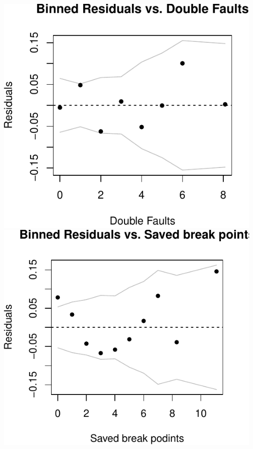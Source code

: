 \documentclass[]{article}
\newenvironment{Shaded}{\begin{snugshade}}{\end{snugshade}}
\newcommand{\DataTypeTok}[1]{\textcolor[rgb]{0.13,0.29,0.53}{#1}}
\newcommand{\KeywordTok}[1]{\textcolor[rgb]{0.13,0.29,0.53}{\textbf{#1}}}
\newcommand{\NormalTok}[1]{#1}
\newcommand{\OperatorTok}[1]{\textcolor[rgb]{0.81,0.36,0.00}{\textbf{#1}}}
\newcommand{\StringTok}[1]{\textcolor[rgb]{0.31,0.60,0.02}{#1}}
\begin{document}
\includegraphics{Project_files/figure-latex/unnamed-chunk-14-5.pdf}
\includegraphics{Project_files/figure-latex/unnamed-chunk-14-6.pdf}

\begin{Shaded}
\end{Shaded}
\end{document}
